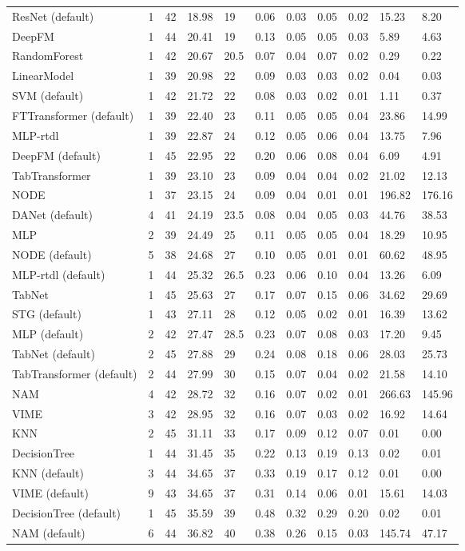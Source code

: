 \begin{tabular}{lllllllllll}
ResNet (default) & 1 & 42 & 18.98 & 19 & 0.06 & 0.03 & 0.05 & 0.02 & 15.23 & 8.20 \\
DeepFM & 1 & 44 & 20.41 & 19 & 0.13 & 0.05 & 0.05 & 0.03 & 5.89 & 4.63 \\
RandomForest & 1 & 42 & 20.67 & 20.5 & 0.07 & 0.04 & 0.07 & 0.02 & 0.29 & 0.22 \\
LinearModel & 1 & 39 & 20.98 & 22 & 0.09 & 0.03 & 0.03 & 0.02 & 0.04 & 0.03 \\
SVM (default) & 1 & 42 & 21.72 & 22 & 0.08 & 0.03 & 0.02 & 0.01 & 1.11 & 0.37 \\
FTTransformer (default) & 1 & 39 & 22.40 & 23 & 0.11 & 0.05 & 0.05 & 0.04 & 23.86 & 14.99 \\
MLP-rtdl & 1 & 39 & 22.87 & 24 & 0.12 & 0.05 & 0.06 & 0.04 & 13.75 & 7.96 \\
DeepFM (default) & 1 & 45 & 22.95 & 22 & 0.20 & 0.06 & 0.08 & 0.04 & 6.09 & 4.91 \\
TabTransformer & 1 & 39 & 23.10 & 23 & 0.09 & 0.04 & 0.04 & 0.02 & 21.02 & 12.13 \\
NODE & 1 & 37 & 23.15 & 24 & 0.09 & 0.04 & 0.01 & 0.01 & 196.82 & 176.16 \\
DANet (default) & 4 & 41 & 24.19 & 23.5 & 0.08 & 0.04 & 0.05 & 0.03 & 44.76 & 38.53 \\
MLP & 2 & 39 & 24.49 & 25 & 0.11 & 0.05 & 0.05 & 0.04 & 18.29 & 10.95 \\
NODE (default) & 5 & 38 & 24.68 & 27 & 0.10 & 0.05 & 0.01 & 0.01 & 60.62 & 48.95 \\
MLP-rtdl (default) & 1 & 44 & 25.32 & 26.5 & 0.23 & 0.06 & 0.10 & 0.04 & 13.26 & 6.09 \\
TabNet & 1 & 45 & 25.63 & 27 & 0.17 & 0.07 & 0.15 & 0.06 & 34.62 & 29.69 \\
STG (default) & 1 & 43 & 27.11 & 28 & 0.12 & 0.05 & 0.02 & 0.01 & 16.39 & 13.62 \\
MLP (default) & 2 & 42 & 27.47 & 28.5 & 0.23 & 0.07 & 0.08 & 0.03 & 17.20 & 9.45 \\
TabNet (default) & 2 & 45 & 27.88 & 29 & 0.24 & 0.08 & 0.18 & 0.06 & 28.03 & 25.73 \\
TabTransformer (default) & 2 & 44 & 27.99 & 30 & 0.15 & 0.07 & 0.04 & 0.02 & 21.58 & 14.10 \\
NAM & 4 & 42 & 28.72 & 32 & 0.16 & 0.07 & 0.02 & 0.01 & 266.63 & 145.96 \\
VIME & 3 & 42 & 28.95 & 32 & 0.16 & 0.07 & 0.03 & 0.02 & 16.92 & 14.64 \\
KNN & 2 & 45 & 31.11 & 33 & 0.17 & 0.09 & 0.12 & 0.07 & 0.01 & 0.00 \\
DecisionTree & 1 & 44 & 31.45 & 35 & 0.22 & 0.13 & 0.19 & 0.13 & 0.02 & 0.01 \\
KNN (default) & 3 & 44 & 34.65 & 37 & 0.33 & 0.19 & 0.17 & 0.12 & 0.01 & 0.00 \\
VIME (default) & 9 & 43 & 34.65 & 37 & 0.31 & 0.14 & 0.06 & 0.01 & 15.61 & 14.03 \\
DecisionTree (default) & 1 & 45 & 35.59 & 39 & 0.48 & 0.32 & 0.29 & 0.20 & 0.02 & 0.01 \\
NAM (default) & 6 & 44 & 36.82 & 40 & 0.38 & 0.26 & 0.15 & 0.03 & 145.74 & 47.17 \\
\bottomrule
\end{tabular}
